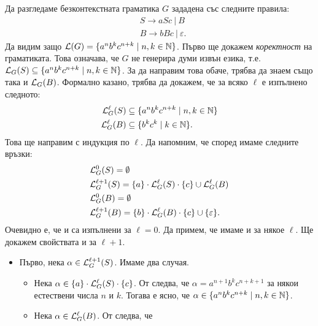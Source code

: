 \begin{extra}
  \begin{example}
    Да разгледаме безконтекстната граматика $G$ зададена със следните правила:
    \begin{align*}
      & S \to aSc\ |\  B\\
      & B \to bBc\ |\ \varepsilon.
    \end{align*}
    Да видим защо $\mathcal{L}(G) = \{a^nb^kc^{n+k} \mid n,k\in\mathbb{N}\}$.
    Първо ще докажем \emph{коректност} на граматиката. Това означава, че $G$ не генерира думи извън езика, т.е.
    $\mathcal{L}_G(S) \subseteq \{a^nb^kc^{n+k} \mid n,k\in\mathbb{N}\}$. За да направим това обаче, трябва да знаем също така и $\mathcal{L}_G(B)$.
    Формално казано, трябва да докажем, че за всяко $\ell$ е изпълнено следното:
    \begin{align}
      \mathcal{L}^\ell_G(S) & \subseteq \{a^nb^kc^{n+k} \mid n,k\in\mathbb{N}\} \label{eq:nknk1}\\
      \mathcal{L}^\ell_G(B) & \subseteq \{b^kc^k \mid k \in \mathbb{N}\} \label{eq:nknk2}.
    \end{align}
    Това ще направим с индукция по $\ell$.
    Да напомним, че според  имаме следните връзки:
    \begin{align*}
      & \mathcal{L}^0_G(S) = \emptyset\\
      & \mathcal{L}^{\ell+1}_G(S) = \{a\} \cdot \mathcal{L}^\ell_G(S) \cdot \{c\} \cup \mathcal{L}^\ell_G(B)\\
      & \mathcal{L}^0_G(B) = \emptyset\\
      & \mathcal{L}^{\ell+1}_G(B) = \{b\} \cdot \mathcal{L}^\ell_G(B) \cdot \{c\} \cup \{\varepsilon\}.
    \end{align*}
    Очевидно е, че  и  са изпълнени за $\ell = 0$.
    Да примем, че имаме  и  за някое $\ell$.
    Ще докажем свойствата и за $\ell+1$.
    \begin{itemize}
    \item
      Първо, нека $\alpha \in \mathcal{L}^{\ell+1}_G(S)$. Имаме два случая.
      \begin{itemize}
      \item
        Нека $\alpha \in \{a\} \cdot \mathcal{L}^\ell_G(S) \cdot \{c\}$. От \IndHyp следва, че
        $\alpha = a^{n+1}b^kc^{n+k+1}$ за някои естествени числа $n$ и $k$.
        Тогава е ясно, че $\alpha \in \{a^nb^kc^{n+k} \mid n,k\in\mathbb{N}\}$.
      \item
        Нека $\alpha \in  \mathcal{L}^\ell_G(B)$. От \IndHyp следва, че

\end{itemize}
\end{itemize}
\end{example}
\end{extra}
